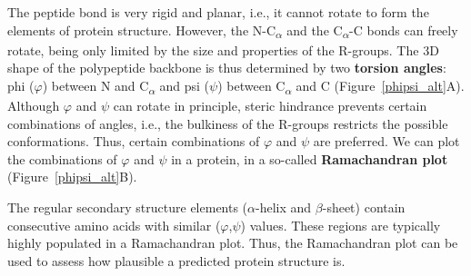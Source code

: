 The peptide bond is very rigid and planar, i.e., it cannot rotate to form the elements of protein structure.
However, the N-C\textsubscript{$\alpha$} and the C\textsubscript{$\alpha$}-C bonds can freely rotate, being only limited by the size and properties of the R-groups.
The 3D shape of the polypeptide backbone is thus determined by two \textbf{torsion angles}:
phi ($\varphi$) between N and C\textsubscript{$\alpha$} and psi ($\psi$) between C\textsubscript{$\alpha$} and C (Figure~\ref{phipsi_alt}A).
Although $\varphi$ and $\psi$ can rotate in principle, steric hindrance prevents certain combinations of angles, i.e., the bulkiness of the R-groups restricts the possible conformations.
Thus, certain combinations of $\varphi$ and $\psi$ are preferred.
We can plot the combinations of $\varphi$ and $\psi$ in a protein, in a so-called \textbf{Ramachandran plot} (Figure~\ref{phipsi_alt}B).

The regular secondary structure elements ($\alpha$-helix and $\beta$-sheet) contain consecutive amino acids with similar ($\varphi$,$\psi$) values.
These regions are typically highly populated in a Ramachandran plot.
Thus, the Ramachandran plot can be used to assess how plausible a predicted protein structure is.

% 

